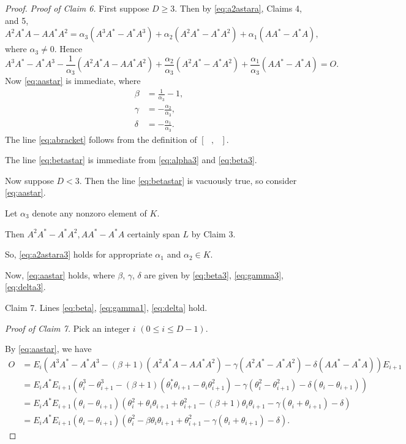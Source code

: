 \documentclass[
]{book}
\theoremstyle{definition}
\theoremstyle{definition}
\theoremstyle{definition}
\theoremstyle{definition}
\theoremstyle{remark}
\begin{document}
\begin{proof}
\emph{Proof of Claim 6.}
First suppose \(D\geq 3\). Then by \eqref{eq:a2astara}, Claims 4, and 5,
\begin{equation}
A^2A^*A-AA^*A^2 = \alpha_3(A^3A^*-A^*A^3)+\alpha_2(A^2A^*-A^*A^2) + \alpha_1(AA^*-A^*A), \label{eq:a2astara3}
\end{equation}
where \(\alpha_3\neq 0\). Hence
\[A^3A^*-A^*A^3-\frac{1}{\alpha_3}(A^2A^*A-AA^*A^2)+\frac{\alpha_2}{\alpha_3}(A^2A^*-A^*A^2)+
\frac{\alpha_1}{\alpha_3}(AA^*-A^*A)=O.\]
Now \eqref{eq:aastar} is immediate, where
\begin{align}
\beta & = \frac{1}{\alpha_3}-1, \label{eq:beta3}\\
\gamma & = -\frac{\alpha_2}{\alpha_3}, \label{eq:gamma3}\\
\delta & = -\frac{\alpha_1}{\alpha_3}. \label{eq:delta3}
\end{align}
The line \eqref{eq:abracket} follows from the definition of \([\text{ }, \text{ }]\).

The line \eqref{eq:betastar} is immediate from \eqref{eq:alpha3} and \eqref{eq:beta3}.

Now suppose \(D < 3\). Then the line \eqref{eq:betastar} is vacuously true, so consider \eqref{eq:aastar}.

Let \(\alpha_3\) denote any nonzoro element of \(K\).

Then \(A^2A^*-A^*A^2, AA^*-A^*A\) certainly span \(L\) by Claim 3.

So, \eqref{eq:a2astara3} holds for appropriate \(\alpha_1\) and \(\alpha_2\in K\).

Now, \eqref{eq:aastar} holds, where \(\beta\), \(\gamma\), \(\delta\) are given by \eqref{eq:beta3}, \eqref{eq:gamma3}, \eqref{eq:delta3}.

Claim 7. Lines \eqref{eq:beta}, \eqref{eq:gamma1}, \eqref{eq:delta} hold.

\emph{Proof of Claim 7.}
Pick an integer \(i\) \((0\leq i\leq D-1)\).

By \eqref{eq:aastar}, we have
\begin{align}
O & = E_i(A^3A^*-A^*A^3-(\beta+1)(A^2A^*A-AA^*A^2)-\gamma(A^2A^*-A^*A^2)-\delta(AA^*-A^*A))E_{i+1}\\
& = E_iA^*E_{i+1}(\theta^3_i-\theta^3_{i+1}-(\beta+1)(\theta^*_i\theta_{i+1}-\theta_i\theta^2_{i+1})-\gamma(\theta^2_i-\theta^2_{i+1})-\delta(\theta_i-\theta_{i+1}))\\
& = E_iA^*E_{i+1}(\theta_i-\theta_{i+1})(\theta^2_i+\theta_i\theta_{i+1}+\theta_{i+1}^2-(\beta+1)\theta_i\theta_{i+1}-\gamma(\theta_i+\theta_{i+1})-\delta)\\
& = E_iA^*E_{i+1}(\theta_i-\theta_{i+1})(\theta^2_i-\beta\theta_i\theta_{i+1}+\theta_{i+1}^2-\gamma(\theta_i+\theta_{i+1})-\delta).
\end{align}


\end{proof}
\end{document}
